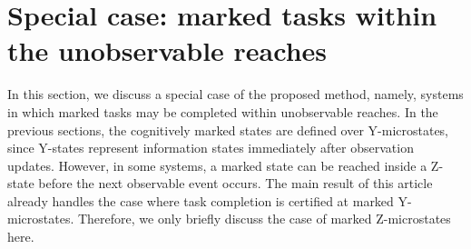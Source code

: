 \documentclass[journal,twoside,web]{ieeecolor}
\begin{document}


\section{Special case: marked tasks within the unobservable reaches}
\label{sec:special_z_marked}

%
% 

In this section, we discuss a special case of the proposed method, namely, systems in which marked tasks may be completed within unobservable reaches.
In the previous sections, the cognitively marked states are defined over Y-microstates, since Y-states represent information states immediately after observation updates.
However, in some systems, a marked state can be reached inside a Z-state before the next observable event occurs.
%
The main result of this article already handles the case where task completion is certified at marked Y-microstates. Therefore, we only briefly discuss the case of marked Z-microstates here.
\end{document}
